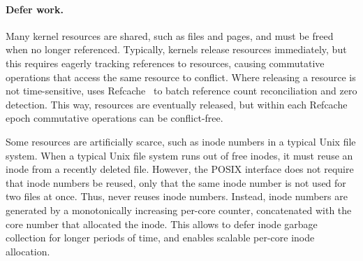 \paragraph{Defer work.} Many kernel resources are shared,
such as files and pages, and must be freed when no longer referenced.
Typically, kernels release resources immediately, but this requires
eagerly tracking references to resources, causing
commutative operations that access the same resource to conflict.  Where
releasing a resource is not time-sensitive, \fs
uses Refcache~\cite{clements:radixvm} to batch reference count
reconciliation and zero detection.  This way, resources are eventually
released, but within each Refcache epoch commutative operations can be
conflict-free.



Some resources are artificially scarce, such as inode numbers in a typical
Unix file system.  When a typical Unix file system runs out of free
inodes, it must reuse an inode from a recently deleted file.  However,
the POSIX interface does not require that inode numbers be reused, only
that the same inode number is not used for two files at once.  Thus,
\fs never reuses inode numbers.  Instead, inode numbers are
generated by a monotonically increasing per-core counter, concatenated
with the core number that allocated the inode.  This allows \fs to defer
inode garbage collection for longer periods of time, and enables scalable
per-core inode allocation.



